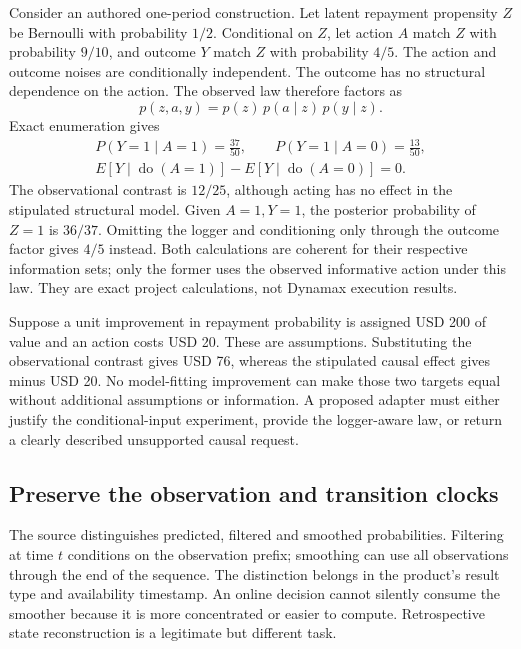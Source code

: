 Consider an authored one-period construction. Let latent repayment propensity
$Z$ be Bernoulli with probability $1/2$. Conditional on $Z$, let action $A$
match $Z$ with probability $9/10$, and outcome $Y$ match $Z$ with probability
$4/5$. The action and outcome noises are conditionally independent. The outcome
has no structural dependence on the action. The observed law therefore factors as
\begin{equation}
 p(z,a,y)=p(z)\,p(a\mid z)\,p(y\mid z).
 \label{exec19:dynamax-law}
\end{equation}
Exact enumeration gives
\begin{equation}
 \begin{gathered}
 P(Y=1\mid A=1)=\frac{37}{50},\qquad
 P(Y=1\mid A=0)=\frac{13}{50},\\
 E[Y\mid\operatorname{do}(A=1)]-E[Y\mid\operatorname{do}(A=0)]=0.
 \end{gathered}
 \label{exec19:dynamax-contrast}
\end{equation}
The observational contrast is $12/25$, although acting has no effect in the
stipulated structural model. Given $A=1,Y=1$, the posterior probability of
$Z=1$ is $36/37$. Omitting the logger and conditioning only through the outcome
factor gives $4/5$ instead. Both calculations are coherent for their respective
information sets; only the former uses the observed informative action under
this law. They are exact project calculations, not Dynamax execution results.
\citep{exec19_dynamax_reference}

Suppose a unit improvement in repayment probability is assigned USD 200 of
value and an action costs USD 20. These are assumptions. Substituting the
observational contrast gives USD 76, whereas the stipulated causal effect gives
minus USD 20. No model-fitting improvement can make those two targets equal
without additional assumptions or information. A proposed adapter must either
justify the conditional-input experiment, provide the logger-aware law, or
return a clearly described unsupported causal request.~\citep{exec19_dynamax_reference}

\subsection{Preserve the observation and transition clocks}
\label{exec19:dynamax-clocks}

The source distinguishes predicted, filtered and smoothed probabilities.
Filtering at time $t$ conditions on the observation prefix; smoothing can use
all observations through the end of the sequence. The distinction belongs in
the product's result type and availability timestamp. An online decision cannot
silently consume the smoother because it is more concentrated or easier to
compute. Retrospective state reconstruction is a legitimate but different task.
\citep{exec19_dynamax_source}

